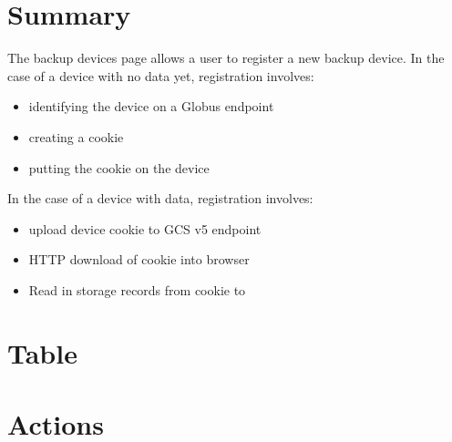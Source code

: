 
\section{Summary}

The backup devices page allows a user to register a new backup device.
In the case of a device with no data yet, registration involves:
\begin{itemize}
    \item identifying the device on a Globus endpoint
    \item creating a cookie
    \item putting the cookie on the device
\end{itemize}

In the case of a device with data, registration involves:
\begin{itemize}
    \item upload device cookie to GCS v5 endpoint
    \item HTTP download of cookie into browser
    \item Read in storage records from cookie to 
\end{itemize}

\section{Table}
\section{Actions}
